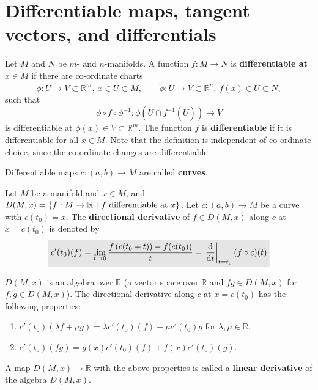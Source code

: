 \documentclass[letter-paper]{tufte-book}
\newenvironment{remark}[1][Remark]{\begin{trivlist}
\item[\hskip \labelsep {\bfseries #1}]}{\end{trivlist}}
\newcommand{\highlight}[1]{\mathchoice%
  {\colorbox{black!10}{$\displaystyle#1$}}%
  {\colorbox{black!10}{$\textstyle#1$}}%
  {\colorbox{black!10}{$\scriptstyle#1$}}%
  {\colorbox{black!10}{$\scriptscriptstyle#1$}}}%
\begin{document}

\section{Differentiable maps, tangent vectors, and differentials}

Let $M$ and $N$ be $m$- and $n$-manifolds. A function $f:M\to N$ is \textbf{differentiable at $x\in M$} if there are co-ordinate charts
\begin{equation*}
  \phi: U\to V\subset \mathbb{R}^m,\ x\in U\subset M, \qquad \tilde{\phi}: \tilde{U}\to \tilde{V}\subset \mathbb{R}^n,\ f(x)\in \tilde{U}\subset N,
\end{equation*}
such that
\begin{equation}
  \tilde{\phi}\circ f \circ \phi^{-1}: \phi\left( U\cap f^{-1}(\tilde{U})\right) \to \tilde{V}
\end{equation}
is differentiable at $\phi(x) \in V \subset \mathbb{R}^m$. The function $f$ is \textbf{differentiable} if it is differentiable for all $x \in M$. Note that the definition is independent of co-ordinate choice, since the co-ordinate changes are differentiable.

Differentiable maps $c:(a,b) \to M$ are called \textbf{curves}.

Let $M$ be a manifold and $x\in M$, and $D(M, x) = \{f: M\to \mathbb{R}\ |\ f\textnormal{ differentiable at } x \}$. Let $c:(a,b) \to M$ be a curve with $c(t_0) = x$. The \textbf{directional derivative} of $f\in D(M,x)$ along $c$ at $x = c(t_0)$ is denoted by
\begin{equation}
  \highlight{c'(t_0)(f) = \lim_{t\to 0} \frac{f\left(c(t_0+t)\right) - f(c(t_0))}{t} = \left.\frac{\mathrm{d}}{\mathrm{d}t}\right|_{t=t_0}(f\circ c)(t)}
\end{equation}

\begin{remark}
  $D(M,x)$ is an algebra over $\mathbb{R}$ (a vector space over $\mathbb{R}$ and $fg \in D(M, x)$ for $f,g \in D(M,x)$). The directional derivative along $c$ at $x=c(t_0)$ has the following properties:
  \begin{enumerate}
    \item $c'(t_0)(\lambda f + \mu g) = \lambda c'(t_0)(f) + \mu c'(t_0)g$ for $\lambda, \mu \in \mathbb{R}$,
    \item $c'(t_0)(fg) = g(x)c'(t_0)(f) + f(x)c'(t_0)(g)$.
  \end{enumerate}
  A map $D(M,x)\to \mathbb{R}$ with the above properties is called a \textbf{linear derivative} of the algebra $D(M,x)$.
\end{remark}
\end{document}
